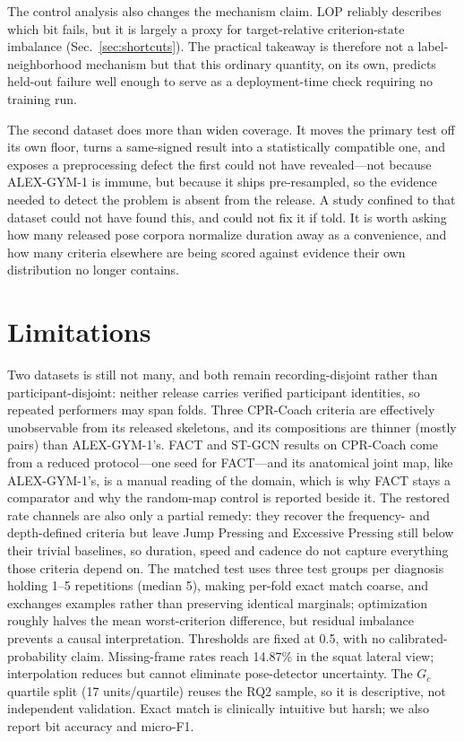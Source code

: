 \documentclass[conference,a4paper]{IEEEtran}
\begin{document}
The control analysis also changes the mechanism claim. LOP reliably describes
which bit fails, but it is largely a proxy for target-relative criterion-state
imbalance (Sec.~\ref{sec:shortcuts}). The practical takeaway is therefore not a
label-neighborhood mechanism but that this ordinary quantity, on its own,
predicts held-out failure well enough to serve as a deployment-time check
requiring no training run.

The second dataset does more than widen coverage. It moves the primary test off
its own floor, turns a same-signed result into a statistically compatible one,
and exposes a preprocessing defect the first could not have revealed---not
because ALEX-GYM-1 is immune, but because it ships pre-resampled, so the
evidence needed to detect the problem is absent from the release. A study
confined to that dataset could not have found this, and could not fix it if
told. It is worth asking how many released pose corpora normalize duration away
as a convenience, and how many criteria elsewhere are being scored against
evidence their own distribution no longer contains.

\section{Limitations}
Two datasets is still not many, and both remain recording-disjoint rather than
participant-disjoint: neither release carries verified participant identities,
so repeated performers may span folds. Three CPR-Coach criteria are effectively
unobservable from its released skeletons, and its compositions are thinner
(mostly pairs) than ALEX-GYM-1's. FACT and ST-GCN results on CPR-Coach come
from a reduced protocol---one seed for FACT---and its anatomical joint map, like
ALEX-GYM-1's, is a manual reading of the domain, which is why FACT stays a
comparator and why the random-map control is reported beside it. The restored
rate channels are also only a partial remedy: they recover the frequency- and
depth-defined criteria but leave Jump Pressing and Excessive Pressing still
below their trivial baselines, so duration, speed and cadence do not capture
everything those criteria depend on. The matched test uses three test groups
per diagnosis holding 1--5 repetitions
(median 5), making per-fold exact match coarse, and exchanges examples rather
than preserving identical marginals; optimization
roughly halves the mean worst-criterion difference, but residual imbalance
prevents a causal interpretation. Thresholds are fixed at 0.5, with
no calibrated-probability claim. Missing-frame rates reach 14.87\% in the
squat lateral view; interpolation reduces but cannot eliminate pose-detector
uncertainty. The $G_c$ quartile split (17 units/quartile) reuses the RQ2
sample, so it is descriptive, not independent validation. Exact match is
clinically intuitive but harsh; we also report bit accuracy and micro-F1.
\end{document}
